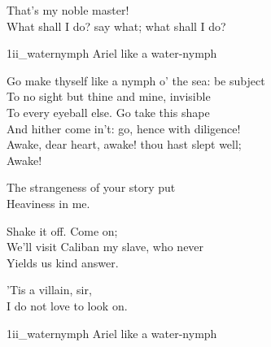 \begin{verse_speech}[Ariel] 
That's my noble master!\\
What shall I do? say what; what shall I do?
\end{verse_speech}


\begin{pictures} %
	\begin{letter}
		\begin{colorbigpic}
			[1.1]
			{1ii_waternymph}
			{Ariel like a water-nymph}
		\end{colorbigpic}
	\end{letter}
\end{pictures}


\begin{verse_speech}[Prospero] 
Go make thyself like a nymph o' the sea: be subject\\
To no sight but thine and mine, invisible\\
To every eyeball else. Go take this shape\\
And hither come in't: go, hence with diligence!\\
Awake, dear heart, awake! thou hast slept well; \\
Awake!
\end{verse_speech}

\begin{verse_speech}[Miranda] 
The strangeness of your story put\\
Heaviness in me.
\end{verse_speech}

\begin{verse_speech}[Prospero] 
Shake it off. Come on;\\
We'll visit Caliban my slave, who never\\
Yields us kind answer.
\end{verse_speech}

\begin{verse_speech}[Miranda] 
'Tis a villain, sir,\\
I do not love to look on.
\end{verse_speech}


\begin{pictures} %
	\begin{a4}
		\begin{colorbigpic}
			[1.0]
			{1ii_waternymph}
			{Ariel like a water-nymph}
		\end{colorbigpic}
	\end{a4}
\end{pictures}




